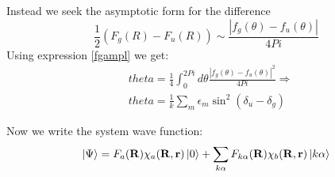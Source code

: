 Instead we seek the asymptotic form for the difference
\begin{equation}
  \frac{1}{2}\left(F_g(R) - F_u(R)\right) \sim \frac{\left|f_g(\theta) - f_u(\theta)\right|}{4Pi}
\end{equation}
Using expression \eqref{fgampl} we get:
\begin{equation}
\begin{split}
  & theta = \frac{1}{4}\int_{0}^{2Pi}d\theta\frac{\left|f_g(\theta) - f_u(\theta)\right|^2}{4Pi} \Rightarrow \\ 
  &  theta = \frac{1}{k}\sum_{m}\epsilon_m\sin^2(\delta_u-\delta_g)
\end{split}
\end{equation}

Now we write the system wave function:
\begin{equation}\label{ansatzWave1}
\Ket{\Psi} = F_a(\mathbf{R})\chi_a(\mathbf{R},\mathbf{r})\Ket{0} + \sum_{k\alpha}{F_{k\alpha}(\mathbf{R})\chi_b(\mathbf{R},\mathbf{r})\Ket{k\alpha}}
\end{equation}

